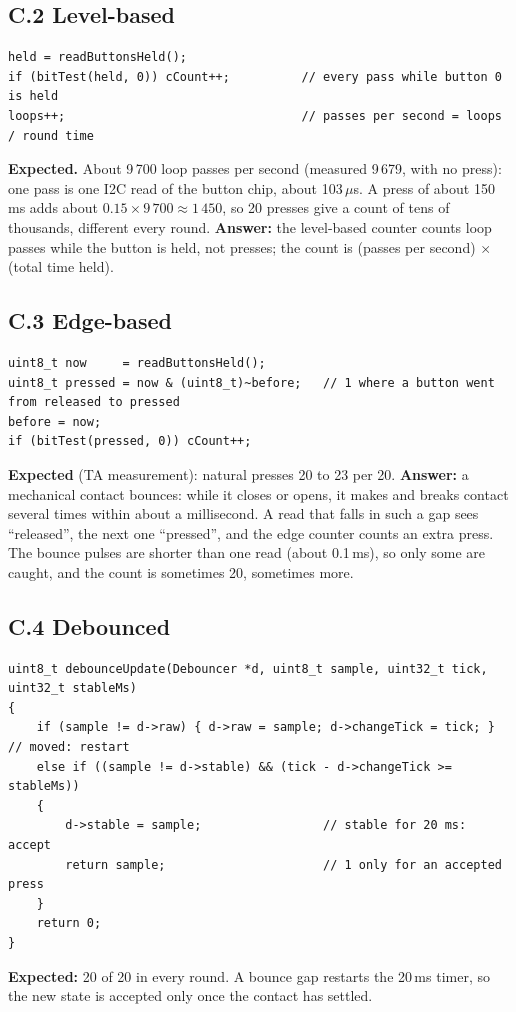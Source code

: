 \documentclass[11pt,a4paper]{article}
\begin{document}
\subsection*{C.2 Level-based}
\begin{lstlisting}
held = readButtonsHeld();
if (bitTest(held, 0)) cCount++;          // every pass while button 0 is held
loops++;                                 // passes per second = loops / round time
\end{lstlisting}
\textbf{Expected.} About 9\,700 loop passes per second (measured 9\,679, with no press): one pass is one I2C read of
the button chip, about 103\,$\mu$s. A press of about 150\,ms adds about $0.15 \times 9\,700 \approx 1\,450$, so 20
presses give a count of tens of thousands, different every round. \textbf{Answer:} the level-based counter counts loop
passes while the button is held, not presses; the count is (passes per second) $\times$ (total time held).

\subsection*{C.3 Edge-based}
\begin{lstlisting}
uint8_t now     = readButtonsHeld();
uint8_t pressed = now & (uint8_t)~before;   // 1 where a button went from released to pressed
before = now;
if (bitTest(pressed, 0)) cCount++;
\end{lstlisting}
\textbf{Expected} (TA measurement): natural presses 20 to 23 per 20.
\textbf{Answer:} a mechanical contact bounces: while it closes or opens, it makes and breaks contact several times
within about a millisecond. A read that falls in such a gap sees ``released'', the next one ``pressed'', and the edge
counter counts an extra press. The bounce pulses are shorter than one read (about 0.1\,ms), so only some are caught,
and the count is sometimes 20, sometimes more.

\subsection*{C.4 Debounced}
\begin{lstlisting}
uint8_t debounceUpdate(Debouncer *d, uint8_t sample, uint32_t tick, uint32_t stableMs)
{
    if (sample != d->raw) { d->raw = sample; d->changeTick = tick; }      // moved: restart
    else if ((sample != d->stable) && (tick - d->changeTick >= stableMs))
    {
        d->stable = sample;                 // stable for 20 ms: accept
        return sample;                      // 1 only for an accepted press
    }
    return 0;
}
\end{lstlisting}
\textbf{Expected:} 20 of 20 in every round. A bounce gap restarts the 20\,ms timer, so the new state is accepted only
once the contact has settled.
\end{document}
